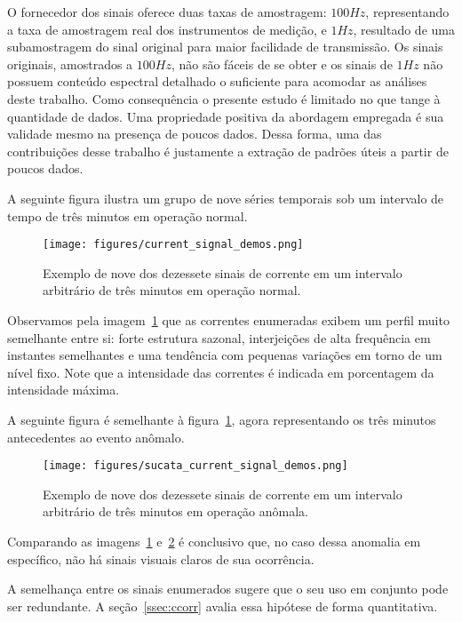 O fornecedor dos sinais oferece duas taxas de amostragem: $100Hz$,
representando a taxa de amostragem real dos instrumentos de medição, e $1Hz$,
resultado de uma subamostragem do sinal original para maior facilidade de
transmissão. Os sinais originais, amostrados a $100Hz$, não são fáceis de se
obter e os sinais de $1Hz$ não possuem conteúdo espectral detalhado o
suficiente para acomodar as análises deste trabalho. Como consequência o
presente estudo é limitado no que tange à quantidade de dados. Uma propriedade
positiva da abordagem empregada é sua validade mesmo na presença de poucos
dados. Dessa forma, uma das contribuições desse trabalho é justamente a
extração de padrões úteis a partir de poucos dados.

A seguinte figura ilustra um grupo de nove séries temporais sob um intervalo
de tempo de três minutos em operação normal.

\begin{figure}[H]
    \centering
    \texttt{[image: figures/current\_signal\_demos.png]}
    \caption{Exemplo de nove dos dezessete sinais de corrente em um intervalo
    arbitrário de três minutos em operação normal.}
    \label{fig:demo}
\end{figure}

Observamos pela imagem~\ref{fig:demo} que as correntes enumeradas exibem um
perfil muito semelhante entre si: forte estrutura sazonal, interjeições de alta
frequência em instantes semelhantes e uma tendência com pequenas variações em
torno de um nível fixo. Note que a intensidade das correntes é indicada em
porcentagem da intensidade máxima.

A seguinte figura é semelhante à figura~\ref{fig:demo}, agora representando os
três minutos antecedentes ao evento anômalo.

\begin{figure}[H]
    \centering
    \texttt{[image: figures/sucata\_current\_signal\_demos.png]}
    \caption{Exemplo de nove dos dezessete sinais de corrente em um intervalo
    arbitrário de três minutos em operação anômala.}
    \label{fig:demo_anomalous}
\end{figure}

Comparando as imagens~\ref{fig:demo} e~\ref{fig:demo_anomalous} é conclusivo
que, no caso dessa anomalia em específico, não há sinais visuais claros de sua
ocorrência.

A semelhança entre os sinais enumerados  sugere que o seu uso em conjunto pode
ser redundante. A seção~\ref{ssec:ccorr} avalia essa hipótese de forma
quantitativa.

